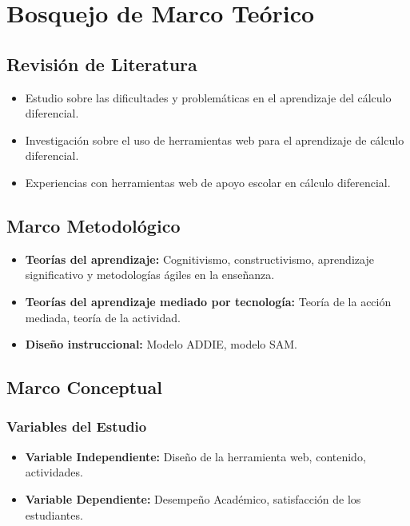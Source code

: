 \documentclass{article}
\begin{document}
\section{Bosquejo de Marco Teórico}

\subsection{Revisión de Literatura}

\begin{itemize}
  \item Estudio sobre las dificultades y problemáticas en el aprendizaje del cálculo diferencial.
  \item Investigación sobre el uso de herramientas web para el aprendizaje de cálculo diferencial.
  \item Experiencias con herramientas web de apoyo escolar en cálculo diferencial.
\end{itemize}
\subsection{Marco Metodológico}
\begin{itemize}
  \item \textbf{Teorías del aprendizaje:} Cognitivismo, constructivismo, aprendizaje significativo y metodologías ágiles en la enseñanza.
  \item \textbf{Teorías del aprendizaje mediado por tecnología:}  Teoría de la acción mediada, teoría de la actividad.
  \item  \textbf{Diseño instruccional:} Modelo ADDIE, modelo SAM.
\end{itemize}

\subsection{Marco Conceptual}

\subsubsection{Variables del Estudio}
\begin{itemize}
  \item \textbf{Variable Independiente:} Diseño de la herramienta web, contenido, actividades.
  \item \textbf{Variable Dependiente:} Desempeño Académico, satisfacción de los estudiantes.
\end{itemize}
\end{document}
